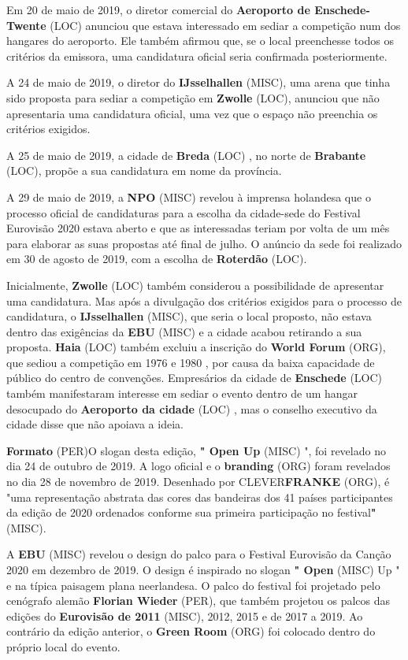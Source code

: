 \documentclass[12pt,a4paper]{article}
\begin{document}
Em 20 de maio de 2019, o diretor comercial do \textbf{Aeroporto de Enschede-Twente} (LOC) anunciou que estava interessado em sediar a competição num dos hangares do aeroporto. Ele também afirmou que, se o local preenchesse todos os critérios da emissora, uma candidatura oficial seria confirmada posteriormente.

A 24 de maio de 2019, o diretor do \textbf{IJsselhallen} (MISC), uma arena que tinha sido proposta para sediar a competição em \textbf{Zwolle} (LOC), anunciou que não apresentaria uma candidatura oficial, uma vez que o espaço não preenchia os critérios exigidos.

A 25 de maio de 2019, a cidade de \textbf{Breda} (LOC) , no norte de \textbf{Brabante} (LOC), propõe a sua candidatura em nome da província.

A 29 de maio de 2019, a \textbf{NPO} (MISC) revelou à imprensa holandesa que o processo oficial de candidaturas para a escolha da cidade-sede do Festival Eurovisão 2020 estava aberto e que as interessadas teriam por volta de um mês para elaborar as suas propostas até final de julho. O anúncio da sede foi realizado em 30 de agosto de 2019, com a escolha de \textbf{Roterdão} (LOC).

Inicialmente, \textbf{Zwolle} (LOC) também considerou a possibilidade de apresentar uma candidatura. Mas após a divulgação dos critérios exigidos para o processo de candidatura, o \textbf{IJsselhallen} (MISC), que seria o local proposto, não estava dentro das exigências da \textbf{EBU} (MISC) e a cidade acabou retirando a sua proposta. \textbf{Haia} (LOC) também excluiu a inscrição do \textbf{World Forum} (ORG), que sediou a competição em 1976 e 1980 , por causa da baixa capacidade de público do centro de convenções. Empresários da cidade de \textbf{Enschede} (LOC) também manifestaram interesse em sediar o evento dentro de um hangar desocupado do \textbf{Aeroporto da cidade} (LOC) , mas o conselho executivo da cidade disse que não apoiava a ideia.



\textbf{Formato} (PER)O slogan desta edição, \textbf{" Open Up} (MISC) ", foi revelado no dia 24 de outubro de 2019. A logo oficial e o \textbf{branding} (ORG) foram revelados no dia 28 de novembro de 2019. Desenhado por CLEVER\textbf{FRANKE} (ORG), é "uma representação abstrata das cores das bandeiras dos 41 países participantes da edição de 2020 ordenados conforme sua primeira participação no festival\textbf{"} (MISC).

A \textbf{EBU} (MISC) revelou o design do palco para o Festival Eurovisão da Canção 2020 em dezembro de 2019. O design é inspirado no slogan \textbf{" Open} (MISC) Up " e na típica paisagem plana neerlandesa. O palco do festival foi projetado pelo cenógrafo alemão \textbf{Florian Wieder} (PER), que também projetou os palcos das edições do \textbf{Eurovisão de 2011} (MISC), 2012, 2015 e de 2017 a 2019. Ao contrário da edição anterior, o \textbf{Green Room} (ORG) foi colocado dentro do próprio local do evento.
\end{document}
